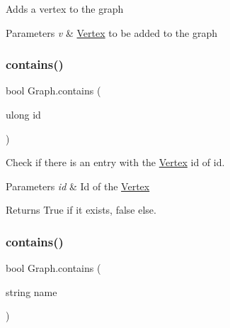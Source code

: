 Adds a vertex to the graph 


\begin{DoxyParams}{Parameters}
{\em v} & \hyperlink{structVertex}{Vertex} to be added to the graph\\
\hline
\end{DoxyParams}
\mbox{\label{classGraph_a4442c1741b2a675c675e5cf7eb1212f6}} 
\subsubsection{\texorpdfstring{contains()}{contains()}\hspace{0.1cm}{\footnotesize\ttfamily [1/5]}}
{\footnotesize\ttfamily bool Graph.\+contains (\begin{DoxyParamCaption}\item[{ulong}]{id }\end{DoxyParamCaption})\hspace{0.3cm}{\ttfamily [inline]}}



Check if there is an entry with the \hyperlink{structVertex}{Vertex} id of id. 


\begin{DoxyParams}{Parameters}
{\em id} & Id of the \hyperlink{structVertex}{Vertex}\\
\hline
\end{DoxyParams}
\begin{DoxyReturn}{Returns}
True if it exists, false else.
\end{DoxyReturn}
\mbox{\label{classGraph_a9d60fda50153d8e9a9c93a7169423b77}} 
\subsubsection{\texorpdfstring{contains()}{contains()}\hspace{0.1cm}{\footnotesize\ttfamily [2/5]}}
{\footnotesize\ttfamily bool Graph.\+contains (\begin{DoxyParamCaption}\item[{string}]{name }\end{DoxyParamCaption})\hspace{0.3cm}{\ttfamily [inline]}}



